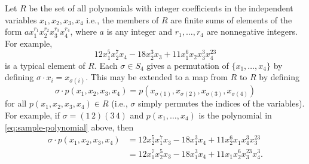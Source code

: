 \label{exercise:subgroup:poly-integer-coef}
Let $R$ be the set of all polynomials with integer coefficients in the
independent variables $x_1,x_2,x_3,x_4$ i.e., the members of $R$ are
finite sums of elements of the form
$ax_1^{r_1}x_2^{r_2}x_3^{r_3}x_4^{r_4}$, where $a$ is any integer and
$r_1,\dots, r_4$ are nonnegative integers. For example,
\begin{equation}
  \label{eq:sample-polynomial}
  12x_1^5x_2^7x_4 - 18x_2^3x_3 + 11x_1^6x_2x_3^3x_4^{23}
\end{equation}
is a typical element of $R$. Each $\sigma\in S_4$ gives a permutation
of $\{x_1,\dots,x_4\}$ by defining $\sigma\cdot x_i =
x_{\sigma(i)}$. This may be extended to a map from $R$ to $R$ by
defining
\begin{equation*}
  \sigma\cdot p(x_1,x_2,x_3,x_4)
  = p(x_{\sigma(1)},x_{\sigma(2)},x_{\sigma(3)},x_{\sigma(4)})
\end{equation*}
for all $p(x_1,x_2,x_3,x_4)\in R$ (i.e., $\sigma$ simply permutes the
indices of the variables). For example, if $\sigma = (1\,2)(3\,4)$ and
$p(x_1,\dots,x_4)$ is the polynomial in \eqref{eq:sample-polynomial}
above, then
\begin{align*}
  \sigma\cdot p(x_1,x_2,x_3,x_4)
  &= 12x_2^5x_1^7x_3 - 18x_1^3x_4 + 11x_2^6x_1x_4^3x_3^{23} \\
  &= 12x_1^7x_2^5x_3 - 18x_1^3x_4 + 11x_1x_2^6x_3^{23}x_4^3.
\end{align*}
